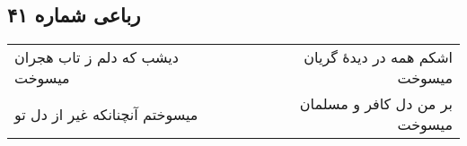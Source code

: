 \begin{center}
\section*{رباعی شماره ۴۱}
\label{sec:sh041}
\begin{longtable}{l p{0.5cm} r}
دیشب که دلم ز تاب هجران میسوخت
&&
اشکم همه در دیدهٔ گریان میسوخت
\\
میسوختم آنچنانکه غیر از دل تو
&&
بر من دل کافر و مسلمان میسوخت
\\
\end{longtable}
\end{center}
